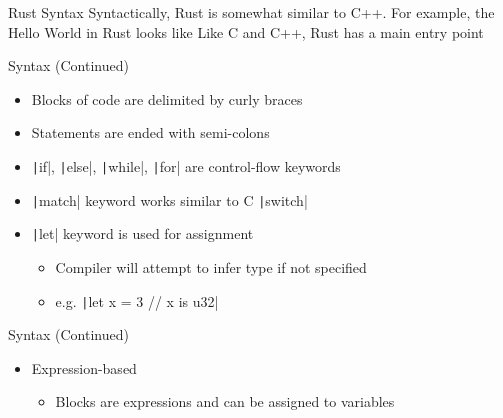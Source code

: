 \begin{frame}{Rust Syntax}
    \pause
    Syntactically, Rust is somewhat similar to C++. For example, the Hello World
    in Rust looks like
    \pause
    \pause
    Like C and C++, Rust has a \alert{main} entry point
\end{frame}

\begin{frame}{Syntax (Continued)}
    \begin{itemize}[<+->]
        \item Blocks of code are delimited by curly braces
        \item \alert{Statements} are ended with semi-colons
        \item \texttt|if|, \texttt|else|,
        \texttt|while|, \texttt|for| are control-flow
        keywords
        \item \texttt|match| keyword works similar to C 
              \texttt|switch|
        \item \texttt|let| keyword is used for assignment
        \begin{itemize}[<+->]
            \item Compiler will attempt to infer type if not specified
            \item e.g. \texttt|let x = 3 // x is u32|
        \end{itemize}
    \end{itemize}
\end{frame}

\begin{frame}{Syntax (Continued)}
    \pause
    \begin{itemize}[<+->]
        \item Expression-based
        \begin{itemize}[<+->]
            \item Blocks are expressions and can be assigned to variables
            \pause{}\pause
        \end{itemize}
    \end{itemize}
\end{frame}

